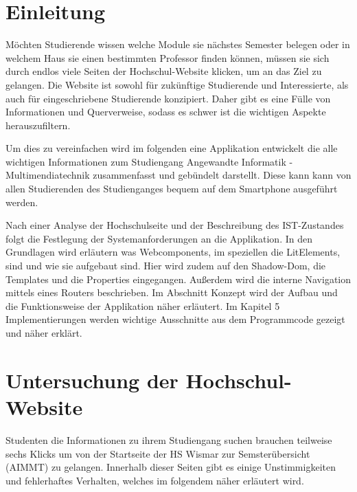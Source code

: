 \documentclass[12pt,					%
							 oneside,			%
							 a4paper,			%
							 halfparskip,		%
							 liststotoc,			%
							 bibtotoc,			%
							 fleqn,				%
							 pointlessnumbers]	%
							 {scrreprt}
\newcommand{\blankpage}{
	\newpage
	\thispagestyle{empty}
	\mbox{}
	\newpage
}
\begin{document}
	\onehalfspacing 					%
	
	\tableofcontents					%


\newpage

\chapter{Einleitung}
Möchten Studierende wissen welche Module sie nächstes Semester belegen oder in welchem Haus sie einen bestimmten Professor finden können, müssen sie sich durch endlos viele Seiten der Hochschul-Website klicken, um an das Ziel zu gelangen. Die Website ist sowohl für zukünftige Studierende und Interessierte, als auch für eingeschriebene Studierende konzipiert. Daher gibt es eine Fülle von Informationen und Querverweise, sodass es schwer ist die wichtigen Aspekte herauszufiltern.

Um dies zu vereinfachen wird im folgenden eine Applikation entwickelt die alle wichtigen Informationen zum Studiengang Angewandte Informatik - Multimendiatechnik zusammenfasst und gebündelt darstellt. Diese kann kann von allen Studierenden des Studienganges bequem auf dem Smartphone ausgeführt werden.

Nach einer Analyse der Hochschulseite und der Beschreibung des IST-Zustandes folgt die Festlegung der Systemanforderungen an die Applikation. In den Grundlagen wird erläutern was Webcomponents, im speziellen die LitElements, sind und wie sie aufgebaut sind. Hier wird zudem auf den Shadow-Dom, die Templates und die Properties eingegangen. Außerdem wird die interne Navigation mittels eines Routers beschrieben. Im Abschnitt Konzept wird der Aufbau und die Funktionsweise der Applikation näher erläutert. Im Kapitel 5 Implementierungen werden wichtige Ausschnitte aus dem Programmcode gezeigt und näher erklärt.

\chapter{Untersuchung der Hochschul-Website}	
Studenten die Informationen zu ihrem Studiengang suchen brauchen teilweise sechs Klicks um von der Startseite der HS Wismar zur Semsterübersicht (AIMMT) zu gelangen. Innerhalb dieser Seiten gibt es einige Unstimmigkeiten und fehlerhaftes Verhalten, welches im folgendem näher erläutert wird.
\end{document}
